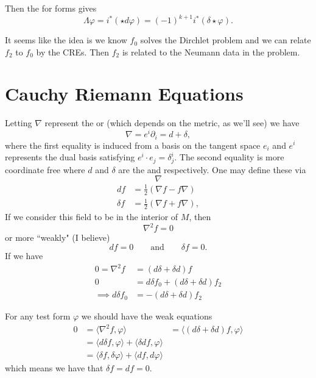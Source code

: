 Then the  for forms gives
\[
\Lambda \varphi = i^*(\star d \varphi) = (-1)^{k+1}i^*(\delta \star \varphi).
\]

It seems like the idea is we know $f_0$ solves the Dirchlet problem and we can relate $f_2$ to $f_0$ by the CREs. Then $f_2$ is related to the Neumann data in the problem.

\section{Cauchy Riemann Equations}

Letting $\nabla$ represent the  or  (which depends on the metric, as we'll see) we have
\[
\nabla = e^i \partial_i = d + \delta,
\]
where the first equality is induced from a basis on the tangent space $e_i$ and $e^i$ represents the dual basis satisfying $e^i \cdot e_j = \delta^i_j$. The second equality is more coordinate free where $d$ and $\delta$ are the  and  respectively. One may define these via
\[
\nabla
\]
\begin{align*}
df &= \frac{1}{2}\left( \nabla f - f\nabla\right)\\
\delta f &= \frac{1}{2} \left( \nabla f + f\nabla\right),
\end{align*}
If we consider this field to be  in the interior of $M$, then
\[
\nabla^2 f =0 
\]
or more ``weakly" (I believe)
\[
d f =0 \qquad \textrm{and} \qquad \delta f = 0.
\]
If we have 
\begin{align*}
    0=\nabla^2 f &= (d\delta +\delta d) f\\
    0&= d\delta f_0 + (d\delta + \delta d)f_2\\
    \implies d\delta f_0 &= -(d\delta + \delta d)f_2
\end{align*}

For any test form $\varphi$ we should have the weak equations
\begin{align*}
    0&=\langle \nabla^2 f, \varphi\rangle &= \langle (d\delta + \delta d)f,\varphi \rangle\\
    &= \langle d \delta f, \varphi\rangle + \langle \delta d f, \varphi \rangle \\
    &= \langle \delta f, \delta \varphi \rangle + \langle df,d\varphi\rangle
\end{align*}
which means we have that $\delta f=df=0$.

